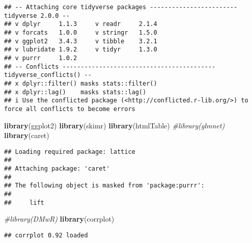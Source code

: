 \documentclass[
]{article}
\newenvironment{Shaded}{\begin{snugshade}}{\end{snugshade}}
\newcommand{\CommentTok}[1]{\textcolor[rgb]{0.56,0.35,0.01}{\textit{#1}}}
\newcommand{\FunctionTok}[1]{\textcolor[rgb]{0.13,0.29,0.53}{\textbf{#1}}}
\newcommand{\NormalTok}[1]{#1}
\begin{document}
\begin{verbatim}
## -- Attaching core tidyverse packages ------------------------ tidyverse 2.0.0 --
## v dplyr     1.1.3     v readr     2.1.4
## v forcats   1.0.0     v stringr   1.5.0
## v ggplot2   3.4.3     v tibble    3.2.1
## v lubridate 1.9.2     v tidyr     1.3.0
## v purrr     1.0.2     
## -- Conflicts ------------------------------------------ tidyverse_conflicts() --
## x dplyr::filter() masks stats::filter()
## x dplyr::lag()    masks stats::lag()
## i Use the conflicted package (<http://conflicted.r-lib.org/>) to force all conflicts to become errors
\end{verbatim}

\begin{Shaded}
\begin{Highlighting}[]
\FunctionTok{library}\NormalTok{(ggplot2)}
\FunctionTok{library}\NormalTok{(skimr)}
\FunctionTok{library}\NormalTok{(htmlTable)}
\CommentTok{\#library(glmnet)}
\FunctionTok{library}\NormalTok{(caret)}
\end{Highlighting}
\end{Shaded}

\begin{verbatim}
## Loading required package: lattice
## 
## Attaching package: 'caret'
## 
## The following object is masked from 'package:purrr':
## 
##     lift
\end{verbatim}

\begin{Shaded}
\begin{Highlighting}[]
\CommentTok{\#library(DMwR)}
\FunctionTok{library}\NormalTok{(corrplot)}
\end{Highlighting}
\end{Shaded}

\begin{verbatim}
## corrplot 0.92 loaded
\end{verbatim}
\end{document}
